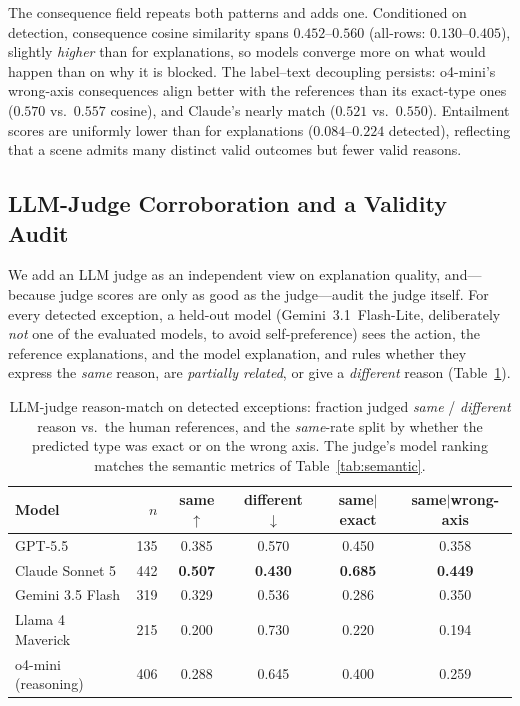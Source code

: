 \documentclass[runningheads]{llncs}
\begin{document}
The consequence field repeats both patterns and adds one.
Conditioned on detection, consequence cosine similarity spans $0.452$--$0.560$ (all-rows: $0.130$--$0.405$), slightly \emph{higher} than for explanations, so models converge more on what would happen than on why it is blocked.
The label--text decoupling persists: o4-mini's wrong-axis consequences align better with the references than its exact-type ones ($0.570$ vs.\ $0.557$ cosine), and Claude's nearly match ($0.521$ vs.\ $0.550$).
Entailment scores are uniformly lower than for explanations ($0.084$--$0.224$ detected), reflecting that a scene admits many distinct valid outcomes but fewer valid reasons.

\subsection{LLM-Judge Corroboration and a Validity Audit}
\label{sec:judge}

We add an LLM judge as an independent view on explanation quality, and---because judge scores are only as good as the judge---audit the judge itself.
For every detected exception, a held-out model (Gemini~3.1~Flash-Lite, deliberately \emph{not} one of the evaluated models, to avoid self-preference) sees the action, the reference explanations, and the model explanation, and rules whether they express the \emph{same} reason, are \emph{partially related}, or give a \emph{different} reason (Table~\ref{tab:judge}).

\begin{table}[t]
  \centering
  \footnotesize
  \setlength{\tabcolsep}{5pt}
  \caption{LLM-judge reason-match on detected exceptions: fraction judged \emph{same} / \emph{different} reason vs.\ the human references, and the \emph{same}-rate split by whether the predicted type was exact or on the wrong axis. The judge's model ranking matches the semantic metrics of Table~\ref{tab:semantic}.}
  \label{tab:judge}
  \begin{tabular}{lrcccc}
    \toprule
    Model & $n$ & same $\uparrow$ & different $\downarrow$ & same$\vert$exact & same$\vert$wrong-axis \\
    \midrule
    GPT-5.5             & 135 & 0.385 & 0.570 & 0.450 & 0.358 \\
    Claude Sonnet 5     & 442 & \textbf{0.507} & \textbf{0.430} & \textbf{0.685} & \textbf{0.449} \\
    Gemini 3.5 Flash    & 319 & 0.329 & 0.536 & 0.286 & 0.350 \\
    Llama 4 Maverick    & 215 & 0.200 & 0.730 & 0.220 & 0.194 \\
    \midrule
    o4-mini (reasoning) & 406 & 0.288 & 0.645 & 0.400 & 0.259 \\
    \bottomrule
  \end{tabular}
\end{table}
\end{document}
